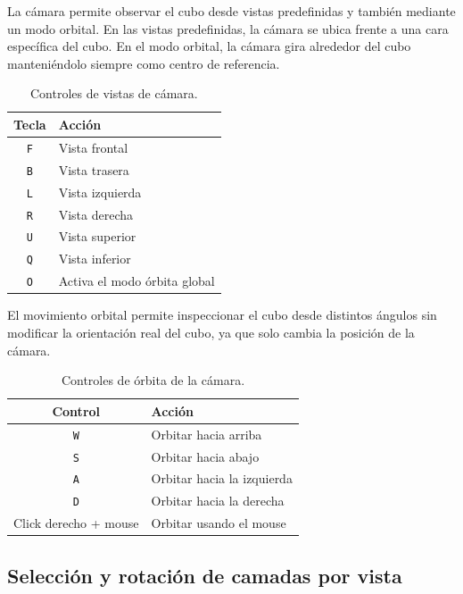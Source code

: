 \documentclass[12pt,a4paper]{article}
\begin{document}
La cámara permite observar el cubo desde vistas predefinidas y también mediante un modo orbital. 
En las vistas predefinidas, la cámara se ubica frente a una cara específica del cubo. En el modo orbital, la cámara gira alrededor del cubo manteniéndolo siempre como centro de referencia.

\begin{table}[H]
\centering
\begin{tabular}{|c|l|}
\hline
\textbf{Tecla} & \textbf{Acción} \\ \hline
\texttt{F} & Vista frontal \\ \hline
\texttt{B} & Vista trasera \\ \hline
\texttt{L} & Vista izquierda \\ \hline
\texttt{R} & Vista derecha \\ \hline
\texttt{U} & Vista superior \\ \hline
\texttt{Q} & Vista inferior \\ \hline
\texttt{O} & Activa el modo órbita global \\ \hline
\end{tabular}
\caption{Controles de vistas de cámara.}
\end{table}

El movimiento orbital permite inspeccionar el cubo desde distintos ángulos sin modificar la orientación real del cubo, ya que solo cambia la posición de la cámara.

\begin{table}[H]
\centering
\begin{tabular}{|c|l|}
\hline
\textbf{Control} & \textbf{Acción} \\ \hline
\texttt{W} & Orbitar hacia arriba \\ \hline
\texttt{S} & Orbitar hacia abajo \\ \hline
\texttt{A} & Orbitar hacia la izquierda \\ \hline
\texttt{D} & Orbitar hacia la derecha \\ \hline
Click derecho + mouse & Orbitar usando el mouse \\ \hline
\end{tabular}
\caption{Controles de órbita de la cámara.}
\end{table}

\subsection{Selección y rotación de camadas por vista}
\end{document}
